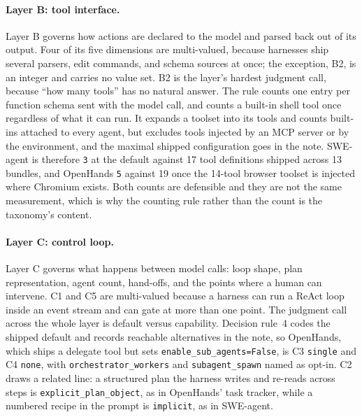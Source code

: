
\paragraph{Layer B: tool interface.}\label{subsec:layer-b}
Layer B governs how actions are declared to the model and parsed back out of its output. Four of its
five dimensions are multi-valued, because harnesses ship several parsers, edit commands, and schema
sources at once; the exception, B2, is an integer and carries no value set. B2 is the layer's hardest
judgment call, because ``how many tools'' has no natural answer. The rule counts one entry per function
schema sent with the model call, and counts a built-in shell tool once regardless of what it can run. It
expands a toolset into its tools and counts built-ins attached to every agent, but excludes tools
injected by an MCP server or by the environment, and the maximal shipped configuration goes in the note.
SWE-agent is therefore \texttt{3} at the default against 17 tool definitions shipped across 13 bundles,
and OpenHands \texttt{5} against 19 once the 14-tool browser toolset is injected where Chromium exists.
Both counts are defensible and they are not the same measurement, which is why the counting rule rather
than the count is the taxonomy's content.


\paragraph{Layer C: control loop.}\label{subsec:layer-c}
Layer C governs what happens between model calls: loop shape, plan representation, agent count,
hand-offs, and the points where a human can intervene. C1 and C5 are multi-valued because a harness can
run a ReAct loop inside an event stream and can gate at more than one point. The judgment call across the
whole layer is default versus capability. Decision rule~4 codes the shipped default and records
reachable alternatives in the note, so OpenHands, which ships a delegate tool but sets
\texttt{enable\_sub\_agents=False}, is C3 \texttt{single} and C4 \texttt{none}, with
\texttt{orchestrator\_workers} and \texttt{subagent\_spawn} named as opt-in. C2 draws a related line: a
structured plan the harness writes and re-reads across steps is \texttt{explicit\_plan\_object}, as in
OpenHands' task tracker, while a numbered recipe in the prompt is \texttt{implicit}, as in SWE-agent.


